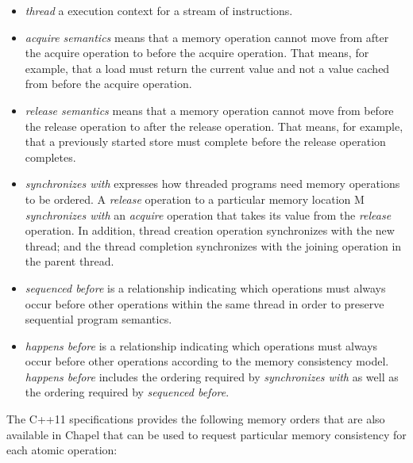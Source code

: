\begin{itemize}

  \item \textit{thread} a execution context for a stream of instructions.

  \item \textit{acquire semantics} means that a memory operation cannot move
  from after the acquire operation to before the acquire operation. That means,
  for example, that a load must return the current value and not a value cached
  from before the acquire operation.

  \item \textit{release semantics} means that a memory operation cannot move
  from before the release operation to after the release operation. That means,
  for example, that a previously started store must complete before the release
  operation completes.

  \item \textit{synchronizes with} expresses how threaded programs need
  memory operations to be ordered. A \textit{release} operation to a particular
  memory location M \textit{synchronizes with} an \textit{acquire} operation
  that takes its value from the \textit{release} operation. In addition, thread
  creation operation synchronizes with the new thread; and the thread
  completion synchronizes with the joining operation in the parent thread.

  \item \textit{sequenced before} is a relationship indicating which operations
  must always occur before other operations within the same thread in order to
  preserve sequential program semantics.

  \item \textit{happens before} is a relationship indicating which operations
  must always occur before other operations according to the memory consistency
  model. \textit{happens before} includes the ordering required by
  \textit{synchronizes with} as well as the ordering required by
  \textit{sequenced before}.

\end{itemize}
 
The C++11 specifications provides the following memory orders that are also
available in Chapel that can be used to request particular memory consistency
for each atomic operation:


